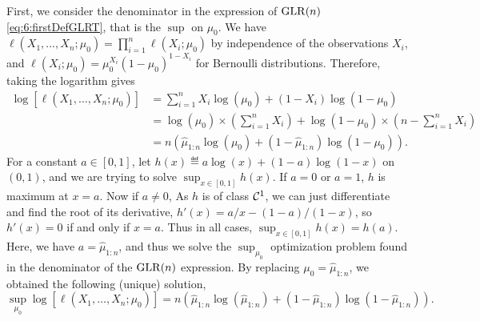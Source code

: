     First, we consider the denominator in the expression of $\mathrm{GLR}(n)$ \eqref{eq:6:firstDefGLRT}, that is the $\sup$ on $\mu_0$.
    We have $\ell(X_1, \dots, X_n ; \mu_0) = \prod\limits_{i=1}^n \ell(X_i ; \mu_0)$ by independence of the observations $X_i$,
    and $\ell(X_i ; \mu_0) = \mu_0^{X_i} (1-\mu_0)^{1-X_i}$ for Bernoulli distributions.
    Therefore, taking the logarithm gives
    \begin{align*}
        \log \left[ \ell(X_1, \dots, X_n ; \mu_0) \right]
        &= \sum_{i=1}^n X_i \log(\mu_0) + (1-X_i) \log(1-\mu_0) \\
        &= \log(\mu_0) \times \left( \sum_{i=1}^n X_i \right) + \log(1-\mu_0) \times \left( n - \sum_{i=1}^n X_i \right) \\
        &= n \left( \widehat{\mu}_{1:n} \log(\mu_0) + (1 - \widehat{\mu}_{1:n}) \log(1-\mu_0) \right).
    \end{align*}
    For a constant $a\in[0,1]$, let $h(x) \eqdef a \log(x) + (1-a) \log(1-x)$ on $(0,1)$,
    and we are trying to solve $\sup_{x\in[0,1]} h(x)$.
    If $a=0$ or $a=1$, $h$ is maximum at $x=a$.
    Now if $a\neq0$, As $h$ is of class $\mathcal{C}^1$, we can just differentiate and find the root of its derivative,
    $h'(x) = a/x - (1-a)/(1-x)$, so $h'(x) = 0$ if and only if $x=a$.
    Thus in all cases, $\sup_{x\in[0,1]} h(x) = h(a)$.
    Here, we have $a = \widehat{\mu}_{1:n}$, and thus we solve the $\sup_{\mu_0}$ optimization problem found in the denominator of the $\mathrm{GLR}(n)$ expression.
    By replacing $\mu_0 = \widehat{\mu}_{1:n}$, we obtained the following (unique) solution,
    \begin{equation}\label{eq:6:solutionPbOpt_for_1n}
        \sup_{\mu_0} \log \left[ \ell(X_1, \dots, X_n ; \mu_0) \right] = n \left( \widehat{\mu}_{1:n} \log(\widehat{\mu}_{1:n}) + (1 - \widehat{\mu}_{1:n}) \log(1-\widehat{\mu}_{1:n}) \right).
    \end{equation}

